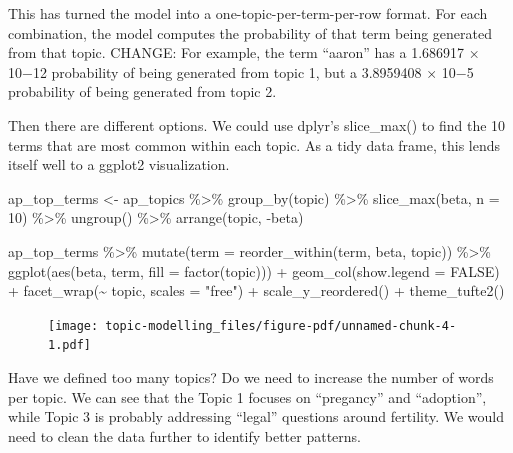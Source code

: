 \documentclass[
  letterpaper,
  DIV=11,
  numbers=noendperiod]{scrreprt}
\newenvironment{Shaded}{\begin{snugshade}}{\end{snugshade}}
\newcommand{\AttributeTok}[1]{\textcolor[rgb]{0.40,0.45,0.13}{#1}}
\newcommand{\ConstantTok}[1]{\textcolor[rgb]{0.56,0.35,0.01}{#1}}
\newcommand{\DecValTok}[1]{\textcolor[rgb]{0.68,0.00,0.00}{#1}}
\newcommand{\FunctionTok}[1]{\textcolor[rgb]{0.28,0.35,0.67}{#1}}
\newcommand{\NormalTok}[1]{\textcolor[rgb]{0.00,0.23,0.31}{#1}}
\newcommand{\OtherTok}[1]{\textcolor[rgb]{0.00,0.23,0.31}{#1}}
\newcommand{\SpecialCharTok}[1]{\textcolor[rgb]{0.37,0.37,0.37}{#1}}
\newcommand{\StringTok}[1]{\textcolor[rgb]{0.13,0.47,0.30}{#1}}
\begin{document}
This has turned the model into a one-topic-per-term-per-row format. For
each combination, the model computes the probability of that term being
generated from that topic. CHANGE: For example, the term ``aaron'' has a
1.686917 × 10−12 probability of being generated from topic 1, but a
3.8959408 × 10−5 probability of being generated from topic 2.

Then there are different options. We could use dplyr's slice\_max() to
find the 10 terms that are most common within each topic. As a tidy data
frame, this lends itself well to a ggplot2 visualization.

\begin{Shaded}
\begin{Highlighting}[]
\NormalTok{ap\_top\_terms }\OtherTok{\textless{}{-}}\NormalTok{ ap\_topics }\SpecialCharTok{\%\textgreater{}\%}
  \FunctionTok{group\_by}\NormalTok{(topic) }\SpecialCharTok{\%\textgreater{}\%}
  \FunctionTok{slice\_max}\NormalTok{(beta, }\AttributeTok{n =} \DecValTok{10}\NormalTok{) }\SpecialCharTok{\%\textgreater{}\%} 
  \FunctionTok{ungroup}\NormalTok{() }\SpecialCharTok{\%\textgreater{}\%}
  \FunctionTok{arrange}\NormalTok{(topic, }\SpecialCharTok{{-}}\NormalTok{beta)}

\NormalTok{ap\_top\_terms }\SpecialCharTok{\%\textgreater{}\%}
  \FunctionTok{mutate}\NormalTok{(}\AttributeTok{term =} \FunctionTok{reorder\_within}\NormalTok{(term, beta, topic)) }\SpecialCharTok{\%\textgreater{}\%}
  \FunctionTok{ggplot}\NormalTok{(}\FunctionTok{aes}\NormalTok{(beta, term, }\AttributeTok{fill =} \FunctionTok{factor}\NormalTok{(topic))) }\SpecialCharTok{+}
  \FunctionTok{geom\_col}\NormalTok{(}\AttributeTok{show.legend =} \ConstantTok{FALSE}\NormalTok{) }\SpecialCharTok{+}
  \FunctionTok{facet\_wrap}\NormalTok{(}\SpecialCharTok{\textasciitilde{}}\NormalTok{ topic, }\AttributeTok{scales =} \StringTok{"free"}\NormalTok{) }\SpecialCharTok{+}
  \FunctionTok{scale\_y\_reordered}\NormalTok{() }\SpecialCharTok{+}
  \FunctionTok{theme\_tufte2}\NormalTok{()}
\end{Highlighting}
\end{Shaded}

\begin{figure}[H]

{\centering \texttt{[image: topic-modelling\_files/figure-pdf/unnamed-chunk-4-1.pdf]}

}

\end{figure}

Have we defined too many topics? Do we need to increase the number of
words per topic. We can see that the Topic 1 focuses on ``pregancy'' and
``adoption'', while Topic 3 is probably addressing ``legal'' questions
around fertility. We would need to clean the data further to identify
better patterns.
\end{document}
